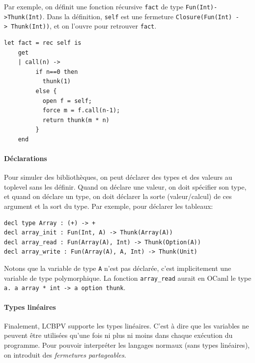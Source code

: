 \documentclass[12pt]{article}
\begin{document}
Par exemple, on définit une fonction récursive \texttt{fact} de type
\texttt{Fun(Int)-\textgreater{}Thunk(Int)}. Dans la définition,
\texttt{self} est une fermeture
\texttt{Closure(Fun(Int)\ -\textgreater{}\ Thunk(Int))}, et on l'ouvre
pour retrouver \texttt{fact}.

\newpage

\begin{verbatim}
let fact = rec self is
    get
    | call(n) -> 
         if n==0 then 
           thunk(1) 
         else {
           open f = self;
           force m = f.call(n-1);
           return thunk(m * n)
         }
    end
\end{verbatim}

\hypertarget{duxe9clarations}{%
      \paragraph*{Déclarations}\label{duxe9clarations}}

Pour simuler des bibliothèques, on peut déclarer des types et des
valeurs au toplevel sans les définir. Quand on déclare une valeur, on
doit spécifier son type, et quand on déclare un type, on doit déclarer
la sorte (valeur/calcul) de ces argument et la sort du type. Par
exemple, pour déclarer les tableaux:

\begin{verbatim}
decl type Array : (+) -> +
decl array_init : Fun(Int, A) -> Thunk(Array(A))
decl array_read : Fun(Array(A), Int) -> Thunk(Option(A))
decl array_write : Fun(Array(A), A, Int) -> Thunk(Unit)
\end{verbatim}

Notons que la variable de type \texttt{A} n'est pas déclarée, c'est
implicitement une variable de type polymorphique. La fonction
\texttt{array\_read} aurait en OCaml le type
\texttt{\textquotesingle{}a.\ \textquotesingle{}a\ array\ *\ int\ -\textgreater{}\ \textquotesingle{}a\ option\ thunk}.

\hypertarget{types-linuxe9aires}{%
      \paragraph*{Types linéaires}\label{types-linuxe9aires}}

Finalement, LCBPV supporte les types linéaires. C'est à dire que les
variables ne peuvent être utilisées qu'une fois ni plus ni moins dans
chaque exécution du programme. Pour pouvoir interpréter les langages
normaux (sans types linéaires), on introduit des \emph{fermetures
      partageables}.
\end{document}

